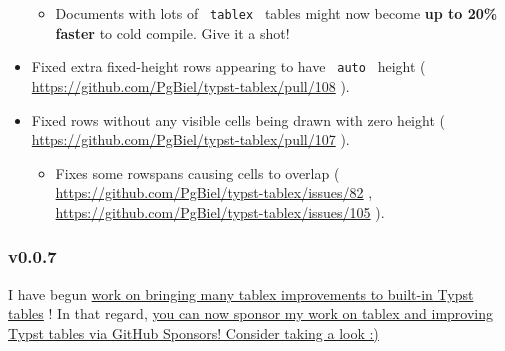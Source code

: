 \begin{itemize}
  \begin{itemize}
  \tightlist
  \item
    Documents with lots of \texttt{\ tablex\ } tables might now become
    \textbf{up to 20\% faster} to cold compile. Give it a shot!
  \end{itemize}
\item
  Fixed extra fixed-height rows appearing to have \texttt{\ auto\ }
  height ( \url{https://github.com/PgBiel/typst-tablex/pull/108} ).
\item
  Fixed rows without any visible cells being drawn with zero height (
  \url{https://github.com/PgBiel/typst-tablex/pull/107} ).

  \begin{itemize}
  \tightlist
  \item
    Fixes some rowspans causing cells to overlap (
    \url{https://github.com/PgBiel/typst-tablex/issues/82} ,
    \url{https://github.com/PgBiel/typst-tablex/issues/105} ).
  \end{itemize}
\end{itemize}

\subsubsection{v0.0.7}\label{v0.0.7}

I have begun
\href{https://github.com/PgBiel/typst-improv-tables-planning}{work on
bringing many tablex improvements to built-in Typst tables} ! In that
regard, \href{https://github.com/sponsors/PgBiel}{you can now sponsor my
work on tablex and improving Typst tables via GitHub Sponsors! Consider
taking a look :)}

